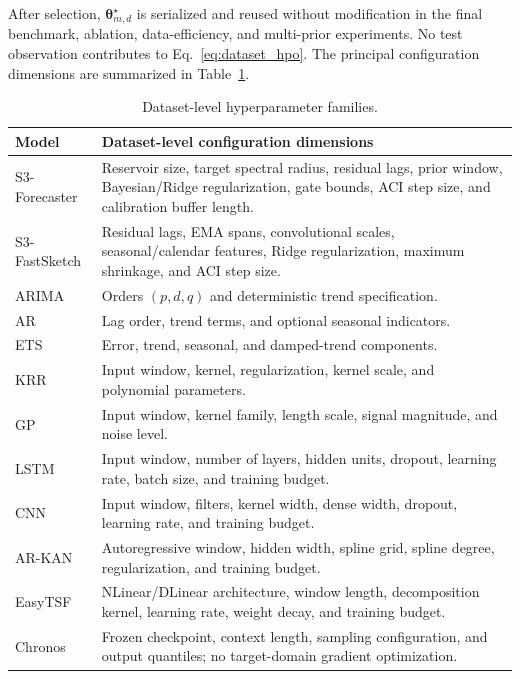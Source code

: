 \documentclass[review,number,sort&compress]{elsarticle}
\begin{document}
After selection, $\bm{\theta}_{m,d}^{\star}$ is serialized and reused without
modification in the final benchmark, ablation, data-efficiency, and multi-prior
experiments. No test observation contributes to Eq.~\eqref{eq:dataset_hpo}.
The principal configuration dimensions are summarized in
Table~\ref{tab:hpo_dimensions}.

\begin{table}[t]
\centering
\caption{Dataset-level hyperparameter families.}
\label{tab:hpo_dimensions}
\small
\setlength{\tabcolsep}{4pt}
\begin{tabularx}{\textwidth}{>{\raggedright\arraybackslash}p{2.7cm}X}
\toprule
Model & Dataset-level configuration dimensions \\
\midrule
S3-Forecaster
&
Reservoir size, target spectral radius, residual lags, prior window,
Bayesian/Ridge regularization, gate bounds, ACI step size, and calibration
buffer length. \\

S3-FastSketch
&
Residual lags, EMA spans, convolutional scales, seasonal/calendar features,
Ridge regularization, maximum shrinkage, and ACI step size. \\

ARIMA
&
Orders $(p,d,q)$ and deterministic trend specification. \\

AR
&
Lag order, trend terms, and optional seasonal indicators. \\

ETS
&
Error, trend, seasonal, and damped-trend components. \\

KRR
&
Input window, kernel, regularization, kernel scale, and polynomial parameters. \\

GP
&
Input window, kernel family, length scale, signal magnitude, and noise level. \\

LSTM
&
Input window, number of layers, hidden units, dropout, learning rate, batch
size, and training budget. \\

CNN
&
Input window, filters, kernel width, dense width, dropout, learning rate, and
training budget. \\

AR-KAN
&
Autoregressive window, hidden width, spline grid, spline degree,
regularization, and training budget. \\

EasyTSF
&
NLinear/DLinear architecture, window length, decomposition kernel, learning
rate, weight decay, and training budget. \\

Chronos
&
Frozen checkpoint, context length, sampling configuration, and output
quantiles; no target-domain gradient optimization. \\
\bottomrule
\end{tabularx}
\end{table}
\end{document}
